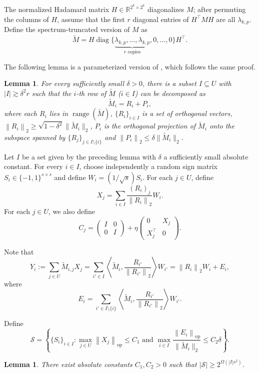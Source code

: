 \documentclass[11pt]{article}
\newtheorem{lemma}[theorem]{Lemma}
\theoremstyle{remark}
\theoremstyle{definition}
\newcommand{\R}{\mathbb{R}}
\newcommand{\cS}{\mathcal{S}}
\newcommand{\norm}[1]{\left\|#1\right\|}
\newcommand{\op}{\textrm{op}}
\DeclareMathOperator{\range}{range}
\DeclareMathOperator{\diag}{diag}
\begin{document}
The normalized Hadamard matrix $H\in \R^{2^k\times 2^k}$ diagonalizes $M$; after permuting
the columns of $H$, assume that the first $r$ diagonal entries of $H^\top M H$ are all
$\lambda_{k,p}$. Define the spectrum-truncated version of $M$ as
\[
	\widetilde{M} = H\diag\{\underbrace{\lambda_{k,p},\dots,\lambda_{k,p}}_{r\text{ copies}}, 0,\dots,0\}H^\top.
\]

The following lemma is a parameterized version of \cite[Lemma 3.6]{LWW21}, which follows the same proof.
\begin{lemma}\label{lem:decomposition}
	For every sufficiently small $\delta > 0$, there is a subset $I\subseteq U$ with $|I|\gtrsim \delta^2 r$ such that the $i$-th row of $\widetilde{M}$ ($i\in I$) can be decomposed as 
	\[
		\widetilde{M}_i = R_i + P_i,
	\]
	where each $R_i$ lies in $\range(\widetilde{M})$, $\{R_i\}_{i\in I}$ is a set of orthogonal vectors, $\norm{R_i}_2\geq \sqrt{1-\delta^2}\|\widetilde{M}_i\|_2$, $P_i$ is the orthogonal projection of $\widetilde{M}_i$ onto the subspace spanned by $\{R_j\}_{j\in I\setminus \{i\} }$ and $\norm{P_i}_2\leq \delta\|\widetilde{M}_i\|_2$.
\end{lemma}

Let $I$ be a set given by the preceding lemma with $\delta$ a sufficiently small absolute constant.
For every $i\in I$, choose independently a random sign matrix $S_i\in \{-1,1\}^{s\times s}$ and define $W_i = (1/\sqrt{s})S_i$. For each $j\in U$, define
\[
	X_j = \sum_{i\in I} \frac{(R_i)_j}{\norm{R_i}_2} W_i.
\]
For each $j\in U$, we also define
\[
	C_j = 
	\begin{pmatrix}
		I & 0 \\
		0 & I 
	\end{pmatrix}
	+
	\eta
	\begin{pmatrix}
		0 & X_j \\
		X_j^\top & 0
	\end{pmatrix}.
\]

Note that
\[
	Y_i := \sum_{j\in U} \widetilde{M}_{i, j} X_j = \sum_{i' \in I} \left\langle \widetilde{M}_i, \frac{R_{i'}}{\norm{R_{i'}}_2}\right\rangle W_{i'} = \norm{R_i}_2 W_i + E_i,
\]
where
\[
	E_i = \sum_{i'\in I\setminus\{i\}} \left\langle \widetilde{M}_i, \frac{R_{i'}}{\norm{R_{i'}}_2}\right\rangle W_{i'}.
\]

Define
\[
	\cS = \left\{ \{S_i\}_{i\in I}: \max_{j\in U} \norm{X_j}_{\op} \leq C_1 \text{ and } \max_{i\in I} \frac{\norm{E_i}_{\op}}{\|\widetilde{M}_i\|_2} \leq C_2\delta \right\}.
\]
\begin{lemma}\label{lem:S_size}
	There exist absolute constants $C_1, C_2 > 0$ such that $|\cS|\geq 2^{\Omega(|I|s^2)}$.
\end{lemma}
\end{document}
